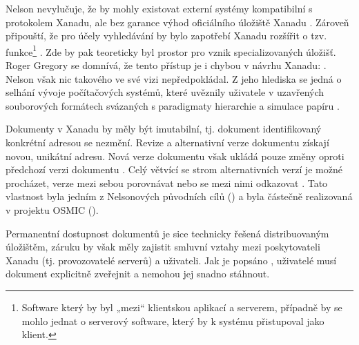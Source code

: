 Nelson nevylučuje, že by mohly existovat externí systémy kompatibilní s protokolem Xanadu, ale bez garance výhod oficiálního úložiště Xanadu \autocite[2/50--2/51]{LitMachines}. Zároveň připouští, že pro účely vyhledávání by bylo zapotřebí Xanadu rozšířit o tzv.  funkce\footnote{Software který by byl „mezi“ klientskou aplikací a serverem, případně by se mohlo jednat o serverový software, který by k systému přistupoval jako klient.}
\autocite[4/72]{LitMachines}. Zde by pak teoreticky byl prostor pro vznik specializovaných úložišť. Roger Gregory se domnívá, že tento přístup je i chybou v návrhu Xanadu: . Nelson však nic takového ve své vizi nepředpokládal. Z jeho hlediska se jedná o selhání vývoje počítačových systémů, které uvěznily uživatele v uzavřených souborových formátech svázaných s paradigmaty hierarchie a simulace papíru \autocite{trollout}.

Dokumenty v Xanadu by měly být imutabilní, tj. dokument identifikovaný konkrétní adresou se nezmění. Revize a alternativní verze dokumentu získají novou, unikátní adresu. Nová verze dokumentu však ukládá pouze změny oproti předchozí verzi dokumentu \autocite[2/13--2/15]{LitMachines}. Celý větvící se strom alternativních verzí je možné procházet, verze mezi sebou porovnávat nebo se mezi nimi odkazovat \autocite[3/3]{LitMachines}. Tato vlastnost byla jedním z Nelsonových původních cílů () a byla částečně realizovaná v projektu OSMIC ().

Permanentní dostupnost dokumentů je sice technicky řešená distribuovaným úložištěm, záruku by však měly zajistit smluvní vztahy mezi poskytovateli Xanadu (tj. provozovatelé serverů) a uživateli. Jak je popsáno , uživatelé musí dokument explicitně zveřejnit a nemohou jej snadno stáhnout.

